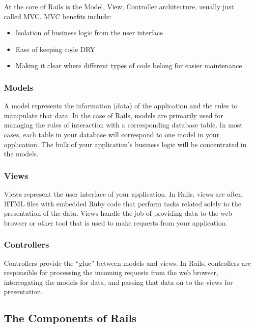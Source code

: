 \documentclass[10pt]{book}
\begin{document}
At the core of Rails is the Model, View, Controller architecture, usually just called MVC. MVC benefits include:
\begin{itemize}
	\item Isolation of business logic from the user interface
	\item Ease of keeping code DRY
	\item Making it clear where different types of code belong for easier maintenance
\end{itemize}

\subsubsection{ Models}

A model represents the information (data) of the application and the rules to manipulate that data. In the case of Rails, models are primarily used for managing the rules of interaction with a corresponding database table. In most cases, each table in your database will correspond to one model in your application. The bulk of your application’s business logic will be concentrated in the models.

\subsubsection{ Views}

Views represent the user interface of your application. In Rails, views are often HTML files with embedded Ruby code that perform tasks related solely to the presentation of the data. Views handle the job of providing data to the web browser or other tool that is used to make requests from your application.

\subsubsection{ Controllers}

Controllers provide the “glue” between models and views. In Rails, controllers are responsible for processing the incoming requests from the web browser, interrogating the models for data, and passing that data on to the views for presentation.

\subsection{ The Components of Rails}
\end{document}
